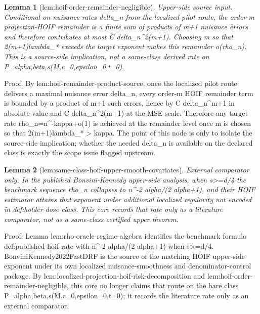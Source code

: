\documentclass{article}
\newtheorem{lemma}{Lemma}
\begin{document}
\begin{lemma}[lem:hoif-order-remainder-negligible]\label{lem:hoif-order-remainder-negligible}
Upper-side source input. Conditional on nuisance rates delta_n from the localized pilot route, the order-m projection-HOIF remainder is a finite sum of products of m+1 nuisance errors and therefore contributes at most C delta_n^{2(m+1)}. Choosing m so that 2(m+1)lambda_* exceeds the target exponent makes this remainder o(rho_n). This is a source-side implication, not a same-class derived rate on P_{alpha,beta,s}(M,c_0,epsilon_0,t_0).
\end{lemma}
Proof. By lem:hoif-remainder-product-source, once the localized pilot route delivers a maximal nuisance error delta_n, every order-m HOIF remainder term is bounded by a product of m+1 such errors, hence by C delta_n^{m+1} in absolute value and C delta_n^{2(m+1)} at the MSE scale. Therefore any target rate rho_n=n^{-kappa+o(1)} is achieved at the remainder level once m is chosen so that 2(m+1)lambda_* > kappa. The point of this node is only to isolate the source-side implication; whether the needed delta_n is available on the declared class is exactly the scope issue flagged upstream.

\begin{lemma}[lem:same-class-hoif-upper-smooth-covariates]\label{lem:same-class-hoif-upper-smooth-covariates}
External comparator only. In the published Bonvini-Kennedy upper-side analysis, when s>=d/4 the benchmark sequence rho_n collapses to n^{-2 alpha/(2 alpha+1)}, and their HOIF estimator attains that exponent under additional localized regularity not encoded in def:holder-dose-class. This core records that rate only as a literature comparator, not as a same-class certified upper theorem.
\end{lemma}
Proof. Lemma lem:rho-oracle-regime-algebra identifies the benchmark formula def:published-hoif-rate with n^{-2 alpha/(2 alpha+1)} when s>=d/4. BonviniKennedy2022FastDRF is the source of the matching HOIF upper-side exponent under its own localized nuisance-smoothness and denominator-control package. By lem:localized-projection-hoif-risk-decomposition and lem:hoif-order-remainder-negligible, this core no longer claims that route on the bare class P_{alpha,beta,s}(M,c_0,epsilon_0,t_0); it records the literature rate only as an external comparator.
\end{document}
